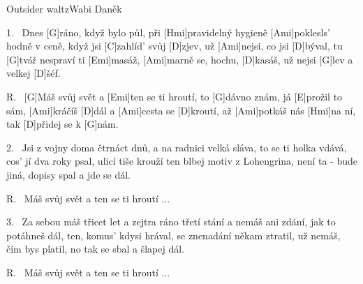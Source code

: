 \begin{song}{Outsider waltz}{Wabi Daněk}

\begin{xverse}{1.~}
Dnes [G]ráno, když bylo půl, při [Hmi]pravidelný hygieně
[Ami]poklesls' hodně v ceně, když jsi [C]zahlíd' svůj [D]zjev,
už [Ami]nejsi, co jsi [D]býval, tu [G]tvář nespraví ti [Emi]masáž,
[Ami]marně se, hochu, [D]kasáš, už nejsi [G]lev a velkej [D]{}šéf.
\end{xverse}

\begin{xverse}{R.~}
[G]Máš svůj svět a [Emi]ten se ti hroutí,
to [G]dávno znám, já [E]prožil to sám,
[Ami]kráčíš [D]dál a [Ami]cesta se [D]kroutí,
až [Ami]potkáš nás [Hmi]na ní, tak   [D]přidej se k [G]nám.
\end{xverse}

\begin{xverse}{2.~}
Jsi z vojny doma čtrnáct dnů, a na radnici velká sláva,
to se ti holka vdává, cos' jí dva roky psal,
ulicí tiše krouží ten blbej motiv z Lohengrina,
není ta - bude jiná, dopisy spal a jde se dál.
\end{xverse}

\begin{xverse}{R.~}
Máš svůj svět a ten se ti hroutí ...
\end{xverse}

\begin{xverse}{3.~}
Za sebou máš třicet let a zejtra ráno třetí stání
a nemáš ani zdání, jak to potáhneš dál,
ten, komus' kdysi hrával, se znenadání někam ztratil,
už nemáš, čím bys platil, no tak se sbal a šlapej dál.
\end{xverse}

\begin{xverse}{R.~}
Máš svůj svět a ten se ti hroutí ...
\end{xverse}

\end{song}

